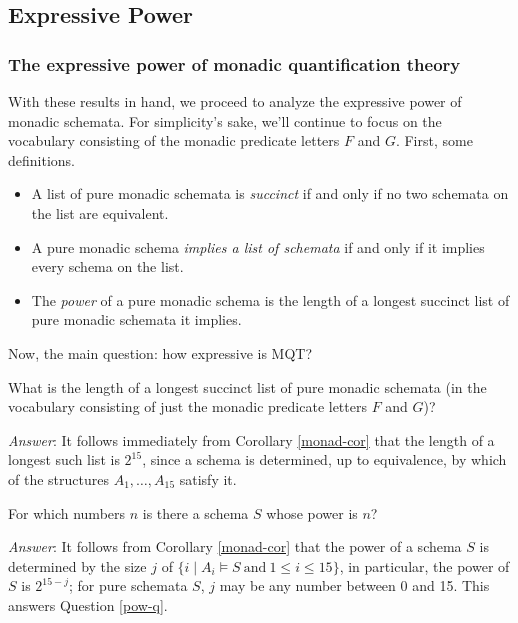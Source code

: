\subsection{Expressive Power}

\subsubsection*{The expressive power of monadic quantification theory}

With these results in hand, we proceed to analyze the expressive power of monadic schemata. For simplicity's sake, we'll continue to focus on the vocabulary consisting of the monadic predicate letters $F$ and $G$. First, some definitions. 
\begin{itemize}
\item 
A list of pure monadic schemata is \textit{succinct} if and only if no two schemata on the list are equivalent. 
\item 
A pure monadic schema \textit{implies a list of schemata} if and only if it implies every schema on the list.
\item The \textit{power} of a pure monadic schema is the length of a longest succinct list of pure monadic schemata it implies.  
\end{itemize}

Now, the main question: how expressive is MQT?

\begin{question}\label{succinct-q}
What is the length of a longest succinct list of pure monadic schemata (in the vocabulary consisting of just the monadic predicate letters $F$ and $G$)? %
\end{question}
\emph{Answer}:
It follows immediately from Corollary \ref{monad-cor} %
that the length of a longest such list is $2^{15}$, since a schema is determined, up to equivalence, by which of the structures $A_1,\ldots,A_{15}$ satisfy it. 
\begin{question}\label{pow-q}
For which numbers $n$ is there a schema $S$ whose power is $n$?
\end{question}
\emph{Answer}:
It follows from Corollary \ref{monad-cor} %
that the power of a schema $S$ is determined by the size $j$ of $\{i\mid A_i\models S\ \mbox{and}\ 1\leq i\leq 15\}$, in particular, the power of $S$ is $2^{15-j}$; for pure schemata $S$, $j$ may be any number between 0 and 15. This answers Question \ref{pow-q}.

